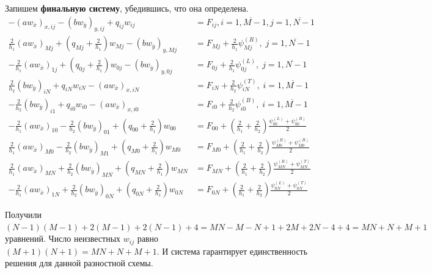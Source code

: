 \documentclass[12pt, fleqn]{article}
\theoremstyle{definition}
\begin{document}
Запишем \textbf{финальную систему}, убедившись, что она определена.
\begin{align*}
  -\left(a w_{\overline{x}}\right)_{x, i j}-\left(b w_{\overline{y}}\right)_{y, i j}+q_{i j} w_{i j} &=F_{i j}, i=\overline{1, M-1}, j=\overline{1, N-1}\\
 \frac{2}{h_{1}}\left(a w_{\overline{x}}\right)_{M j} + \left(q_{M j}+\frac{2 }{h_{1}}\right) w_{M j}-\left(b w_{\overline{y}}\right)_{y, M j}&=F_{M j}+\frac{2}{h_{1}} \psi^{(R)}_{M j}, \; j=\overline{1, N-1} \\
-\frac{2}{h_{1}}\left(a w_{\overline{x}}\right)_{1 j}+\left(q_{0 j}+\frac{2}{h_{1}}\right) w_{0 j}-\left(b w_{\overline{y}}\right)_{y, 0 j}&=F_{0 j}+\frac{2}{h_{1}} \psi^{(L)}_{0 j}, \; j=\overline{1, N-1}\\
\frac{2}{h_{2}}\left(b w_{\overline{y}}\right)_{i N} + q_{i N} w_{i N}-\left(a w_{\overline{x}}\right)_{x, i N}&=F_{i N}+\frac{2}{h_{2}} \psi^{(T)}_{i N},\;  i=\overline{1, M-1}  \\
-\frac{2}{h_{2}}\left(b w_{\overline{y}}\right)_{i 1}+q_{i 0} w_{i 0}-\left(a w_{\overline{x}}\right)_{x, i 0}&=F_{i 0}+\frac{2}{h_{2}} \psi^{(B)}_{i 0},\;  i=\overline{1, M-1} \\
-\frac{2}{h_{1}}\left(a w_{\overline{x}}\right)_{10} - \frac{2}{h_{2}} \left(b w_{\overline{y}}\right)_{01}+\left(q_{00}+ \frac{2}{h_{1}}\right) w_{00}&= F_{00}+\left(\frac{2}{h_{1}} + \frac{2}{h_{2}}\right) \frac{\psi^{(L)}_{00} + \psi^{(B)}_{00}}{2}\\
\frac{2}{h_{1}}\left(a w_{\overline{x}}\right)_{M 0}-\frac{2}{h_{2}}\left(b w_{\overline{y}}\right)_{M 1}+\left(q_{M 0}+\frac{2}{h_{1}}\right) w_{M 0} &= F_{M 0}+\left(\frac{2}{h_{1}}+\frac{2}{h_{2}}\right) \frac{\psi^{(R)}_{M 0} + \psi^{(B)}_{M 0}}{2}\\
\frac{2}{h_{1}}\left(a w_{\overline{x}}\right)_{M N}+\frac{2}{h_{2}}\left(b w_{\overline{y}}\right)_{M N}+\left(q_{M N}+\frac{2}{h_{1}}\right) w_{M N}&= F_{M N}+\left(\frac{2}{h_{1}}+\frac{2}{h_{2}}\right) \frac{\psi^{(R)}_{M N} + \psi^{(T)}_{M N}}{2}\\
-\frac{2}{h_{1}}\left(a w_{\overline{x}}\right)_{1 N}+\frac{2}{h_{2}}\left(b w_{\overline{y}}\right)_{0 N}+\left(q_{0 N}+\frac{2}{h_{1}}\right) w_{0 N}&= F_{0 N}+\left(\frac{2}{h_{1}}+\frac{2}{h_{2}}\right) \frac{\psi^{(L)}_{0 N} + \psi^{(T)}_{0 N}}{2}
\end{align*}

Получили $(N-1)(M-1) + 2(M-1) + 2(N-1) + 4 = MN - M - N + 1 + 2M + 2N - 4 + 4 = MN + N + M + 1$ уравнений. Число неизвестных $w_{ij}$ равно $(M+1)(N+1) = MN + N + M + 1$. И система гарантирует единственность решения для данной разностной схемы.
\end{document}
